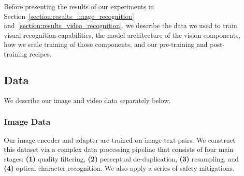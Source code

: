\documentclass[dvipsnames]{fairmeta}
\begin{document}
Before presenting the results of our experiments in Section~\ref{section:results_image_recognition} and~\ref{section:results_video_recognition}, we describe the data we used to train visual recognition capabilities, the model architecture of the vision components, how we scale training of those components, and our pre-training and post-training recipes.

\subsection{Data}
\label{section:vision_data}
We describe our image and video data separately below.

\subsubsection{Image Data}
\label{subsubsection:vision_data_image}
Our image encoder and adapter are trained on image-text pairs.  
We construct this dataset via a complex data processing pipeline that consists of four main stages: \textbf{(1)} quality filtering, \textbf{(2)} perceptual de-duplication, \textbf{(3)} resampling, and \textbf{(4)} optical character recognition.
We also apply a series of safety mitigations.
\end{document}
